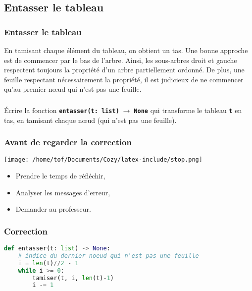 \documentclass[svgnames,11pt]{beamer}
\begin{document}
\subsection{Entasser le tableau}
\begin{frame}
    \frametitle{Entasser le tableau}

    En tamisant chaque élément du tableau, on obtient un tas. Une bonne approche est de commencer par le bas de l'arbre. Ainsi, les sous-arbres droit et gauche respectent toujours la propriété d'un arbre partiellement ordonné. De plus, une feuille respectant nécessairement la propriété, il est judicieux de ne commencer qu'au premier nœud qui n'est pas une feuille.

\end{frame}
\begin{frame}
    \frametitle{}

    \begin{activite}
        Écrire la fonction \texttt{\textbf{entasser(t: list)$\;\rightarrow\;$None}} qui transforme le tableau \textbf{\texttt{t}} en tas, en tamisant chaque nœud (qui n'est pas une feuille).
    \end{activite}

\end{frame}
\begin{frame}
    \frametitle{Avant de regarder la correction}
\begin{center}
    \centering
    \texttt{[image: /home/tof/Documents/Cozy/latex-include/stop.png]}
    \end{center}
{\Large
    \begin{itemize}
        \item Prendre le temps de réfléchir,
        \item Analyser les messages d'erreur,
        \item Demander au professeur.
    \end{itemize}
}
\end{frame}
\begin{frame}[fragile]
    \frametitle{Correction}

\begin{center}
\begin{lstlisting}[language=Python , basicstyle=\ttfamily\small, xleftmargin=2em, xrightmargin=2em]
def entasser(t: list) -> None:
    # indice du dernier noeud qui n'est pas une feuille
    i = len(t)//2 - 1
    while i >= 0:
        tamiser(t, i, len(t)-1)
        i -= 1
\end{lstlisting}
\end{center}   

\end{frame}
\end{document}
